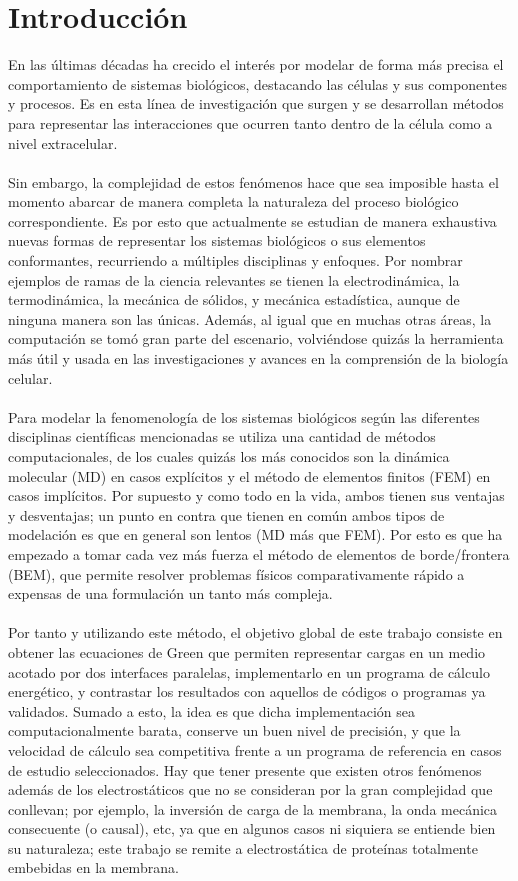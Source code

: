 \documentclass[12pt, oneside, numbers, spanish]{ezthesis}
\numberwithin{equation}{section}
\begin{document}
\chapter{Introducción}\label{Chap:Intro}
En las últimas décadas ha crecido el interés por modelar de forma más precisa el comportamiento de sistemas biológicos, destacando las células y sus componentes y procesos. Es en esta línea de investigación que surgen y se desarrollan métodos para representar las interacciones que ocurren tanto dentro de la célula como a nivel extracelular.\\\\
Sin embargo, la complejidad de estos fenómenos hace que sea imposible hasta el momento abarcar de manera completa la naturaleza del proceso biológico correspondiente. Es por esto que actualmente se estudian de manera exhaustiva nuevas formas de representar los sistemas biológicos o sus elementos conformantes, recurriendo a múltiples disciplinas y enfoques. Por nombrar ejemplos de ramas de la ciencia relevantes se tienen la electrodinámica, la termodinámica, la mecánica de sólidos, y mecánica estadística, aunque de ninguna manera son las únicas. Además, al igual que en muchas otras áreas, la computación se tomó gran parte del escenario, volviéndose quizás la herramienta más útil y usada en las investigaciones y avances en la comprensión de la biología celular.\\\\
Para modelar la fenomenología de los sistemas biológicos según las diferentes disciplinas científicas mencionadas se utiliza una cantidad de métodos computacionales, de los cuales quizás los más conocidos son la dinámica molecular (MD) en casos explícitos y el método de elementos finitos (FEM) en casos implícitos. Por supuesto y como todo en la vida, ambos tienen sus ventajas y desventajas; un punto en contra que tienen en común ambos tipos de modelación es que en general son lentos (MD más que FEM). Por esto es que ha empezado a tomar cada vez más fuerza el método de elementos de borde/frontera (BEM), que permite resolver problemas físicos comparativamente rápido a expensas de una formulación un tanto más compleja.\\\\
Por tanto y utilizando este método, el objetivo global de este trabajo consiste en obtener las ecuaciones de Green que permiten representar cargas en un medio acotado por dos interfaces paralelas, implementarlo en un programa de cálculo energético, y contrastar los resultados con aquellos de códigos o programas ya validados. Sumado a esto, la idea es que dicha implementación sea computacionalmente barata, conserve un buen nivel de precisión, y que la velocidad de cálculo sea competitiva frente a un programa de referencia en casos de estudio seleccionados. Hay que tener presente que existen otros fenómenos además de los electrostáticos que no se consideran por la gran complejidad que conllevan; por ejemplo, la inversión de carga de la membrana, la onda mecánica consecuente (o causal), etc, ya que en algunos casos ni siquiera se entiende bien su naturaleza; este trabajo se remite a electrostática de proteínas totalmente embebidas en la membrana.\\\\
\end{document}
